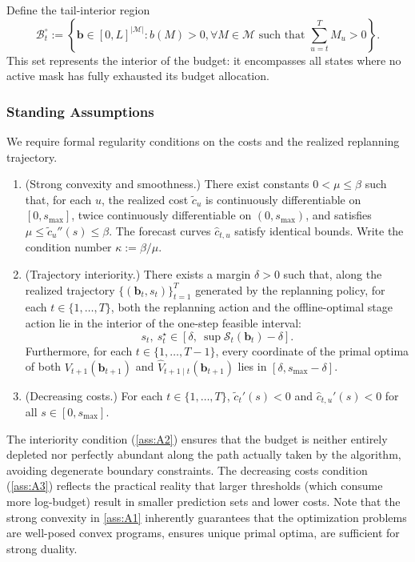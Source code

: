 \documentclass{uai2026} %
\newcommand{\1}{\mathbf{1}}
\newcommand{\scalt}{\mathcal{S}_{t}}
\newcommand{\mcal}{\mathcal{M}}
\newcommand{\bcal}{\mathcal{B}}
\newenvironment{assumptions}{%
  \begingroup
  \renewcommand{\labelenumi}{\textbf{A\arabic{enumi}}.}%
  \renewcommand{\theenumi}{A\arabic{enumi}}%
  \begin{enumerate}
    }{%
  \end{enumerate}
  \endgroup
}
\begin{document}
Define the tail-interior region
\begin{equation*}
  \bcal_{t}^{\circ} := \left\{\mathbf{b}\in[0,L]^{|\mcal|} : b(M)>0, \forall M\in\mcal \text{ such that } \sum_{u=t}^{T} M_u>0 \right\}.
\end{equation*}
This set represents the interior of the budget: it encompasses all states where no active mask has fully exhausted its budget allocation.

\subsubsection{Standing Assumptions}

We require formal regularity conditions on the costs and the realized replanning trajectory.

\begin{assumptions}
\item\label{ass:A1} (Strong convexity and smoothness.) There exist constants $0 < \mu \le \beta$ such that, for each $u$, the realized cost $\tilde{c}_u$ is continuously differentiable on $[0,s_{\max}]$, twice continuously differentiable on $(0,s_{\max})$, and satisfies $\mu \le \tilde{c}_u''(s) \le \beta$. The forecast curves $\hat{c}_{t,u}$ satisfy identical bounds. Write the condition number $\kappa := \beta/\mu$.
\item\label{ass:A2} (Trajectory interiority.)
  There exists a margin $\delta > 0$ such that, along the realized trajectory $\{(\mathbf{b}_t,s_t)\}_{t=1}^{T}$ generated by the replanning policy, for each $t \in \{1,\dots,T\}$, both the replanning action and the offline-optimal stage action lie in the interior of the one-step feasible interval:
  \begin{equation*}
    s_t,\ s_t^{\star}
    \in
    [\delta,\ \sup\scalt(\mathbf{b}_t)-\delta].
  \end{equation*}
  Furthermore, for each $t \in \{1,\dots,T-1\}$, every coordinate of the primal optima of both $V_{t+1}(\mathbf{b}_{t+1})$ and $\hat{V}_{t+1\mid t}(\mathbf{b}_{t+1})$ lies in $[\delta, s_{\max} - \delta]$.
\item\label{ass:A3} (Decreasing costs.)
  For each $t \in \{1,\dots,T\}$, $\tilde{c}_t'(s) < 0$ and $\hat{c}_{t,u}'(s) < 0$ for all $s \in [0,s_{\max}]$.
\end{assumptions}

The interiority condition (\ref{ass:A2}) ensures that the budget is neither entirely depleted nor perfectly abundant along the path actually taken by the algorithm, avoiding degenerate boundary constraints.
The decreasing costs condition (\ref{ass:A3}) reflects the practical reality that larger thresholds (which consume more log-budget) result in smaller prediction sets and lower costs.
Note that the strong convexity in \ref{ass:A1} inherently guarantees that the optimization problems are well-posed convex programs, ensures unique primal optima, are sufficient for strong duality.
\end{document}
